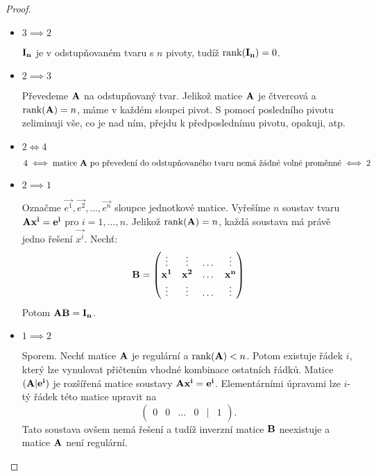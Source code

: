 \begin{proof} 
    \leavevmode
    \begin{itemize}
        \item $3 \implies 2$
            
            $\mathbf{I_n}$ je v odstupňovaném tvaru s $n$ pivoty, tudíž
            $\mathop{\mathrm{rank}}(\mathbf{I_n}) = 0$.

        \item $2 \implies 3$

            Převedeme $\mathbf{A}$ na odstupňovaný tvar. Jelikož matice
            $\mathbf{A}$ je čtvercová a $\mathop{\mathrm{rank}}(\mathbf{A}) = n$, máme v každém
            sloupci pivot. S pomocí posledního pivotu zeliminuji vše, co je
            nad ním, přejdu k předposlednímu pivotu, opakuji, atp.

        \item $2 \iff 4$

            $4 \iff \text{matice $\mathbf{A}$ po převedení do odstupňovaného
            tvaru nemá žádné volné proměnné} \iff 2$

        \item $2 \implies 1$

            Označme $\vec{e^1}, \vec{e^2}, \dots, \vec{e^n}$ sloupce
            jednotkové matice. Vyřešíme $n$ soustav tvaru $\mathbf{A}\mathbf{x^i} = 
            \mathbf{e^i}$ pro $i = 1, \dots, n$. 
            Jelikož $\mathop{\mathrm{rank}}(\mathbf{A}) = n$,
            každá soustava má právě jedno řešení $\vec{x^i}$. Nechť:
            $$ \mathbf{B} = \begin{pmatrix}
                \vdots &\vdots &\dots &\vdots \\
                \mathbf{x^1} &\mathbf{x^2} &\dots &\mathbf{x^n}\\
                \vdots &\vdots &\dots &\vdots 
            \end{pmatrix}$$
            Potom $\mathbf{A}\mathbf{B} = \mathbf{I_n}$.
            
        \item $1 \implies 2$

            Sporem. Nechť matice $\mathbf{A}$ je regulární a $\mathop{\mathrm{rank}}(\mathbf{A})
            < n$. Potom existuje řádek $i$, který lze vynulovat přičtením vhodné
            kombinace ostatních řádků. Matice $(\mathbf{A}|\mathbf{e^i})$ je
            rozšířená matice soustavy $\mathbf{A}\mathbf{x^i} = 
            \mathbf{e^i}$. Elementárními úpravami lze $i$-tý řádek této matice
            upravit na $$\begin{pmatrix} 0 &0 &\dots &0 &| &1\end{pmatrix}.$$
            Tato soustava ovšem nemá řešení a tudíž inverzní matice
            $\mathbf{B}$ neexistuje a matice $\mathbf{A}$ není regulární.
    \end{itemize}
\end{proof}

